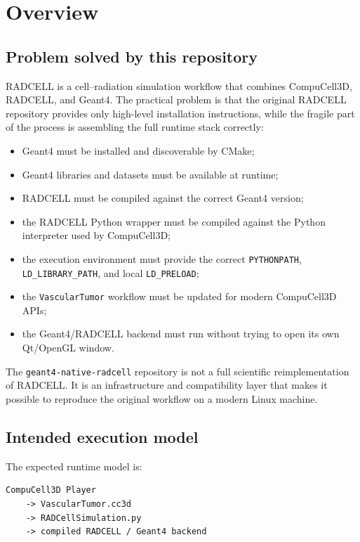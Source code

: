 \documentclass[11pt,a4paper,twoside,pdftex]{refrep}
\begin{document}
\tableofcontents

\chapter{Overview}

\section{Problem solved by this repository}

RADCELL is a cell--radiation simulation workflow that combines CompuCell3D, RADCELL, and Geant4. The practical problem is that the original RADCELL repository provides only high-level installation instructions, while the fragile part of the process is assembling the full runtime stack correctly:

\begin{itemize}
  \item Geant4 must be installed and discoverable by CMake;
  \item Geant4 libraries and datasets must be available at runtime;
  \item RADCELL must be compiled against the correct Geant4 version;
  \item the RADCELL Python wrapper must be compiled against the Python interpreter used by CompuCell3D;
  \item the execution environment must provide the correct \texttt{PYTHONPATH}, \texttt{LD\_LIBRARY\_PATH}, and local \texttt{LD\_PRELOAD};
  \item the \texttt{VascularTumor} workflow must be updated for modern CompuCell3D APIs;
  \item the Geant4/RADCELL backend must run without trying to open its own Qt/OpenGL window.
\end{itemize}

The \texttt{geant4-native-radcell} repository is not a full scientific reimplementation of RADCELL. It is an infrastructure and compatibility layer that makes it possible to reproduce the original workflow on a modern Linux machine.

\section{Intended execution model}

The expected runtime model is:

\begin{lstlisting}
CompuCell3D Player
    -> VascularTumor.cc3d
    -> RADCellSimulation.py
    -> compiled RADCELL / Geant4 backend
\end{lstlisting}
\end{document}
